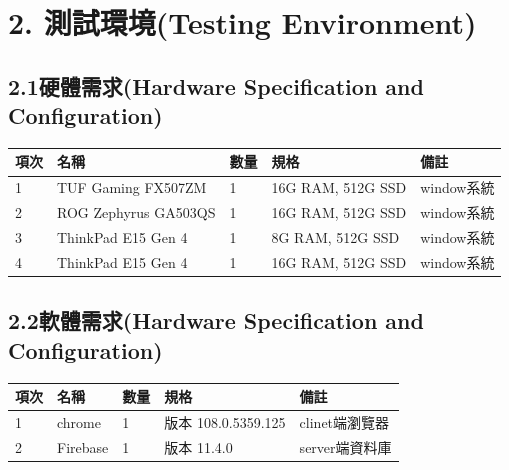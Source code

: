 \documentclass{report}
\begin{document}
\section*{2. 測試環境(Testing Environment)}
\subsection*{2.1硬體需求(Hardware Specification and Configuration)}
\begin{tabularx}{\textwidth}{
  |p{}%
  |p{}%
  |p{}%
  |p{}%
  |p{}|%
}
  \hline
  項次 &  名稱 & 數量 & 規格  & 備註  \\ \hline
  1 & TUF Gaming FX507ZM & 1 & 16G RAM, 512G SSD & window系統  \\ \hline
  2 & ROG Zephyrus GA503QS & 1 & 16G RAM, 512G SSD & window系統  \\ \hline
  3 & ThinkPad E15 Gen 4 & 1 & 8G RAM, 512G SSD & window系統  \\ \hline
  4 & ThinkPad E15 Gen 4 & 1 & 16G RAM, 512G SSD & window系統  \\ \hline
  
\end{tabularx}

\subsection*{2.2軟體需求(Hardware Specification and Configuration)}
\begin{tabularx}{\textwidth}{ 
  |p{}%
  |p{}%
  |p{}%
  |p{}%
  |p{}|%
}
  \hline
  項次 &  名稱 & 數量 & 規格  & 備註  \\
  \hline
  1 & chrome & 1 & 版本 108.0.5359.125 & clinet端瀏覽器  \\
  \hline
  2 & Firebase & 1 & 版本 11.4.0 & server端資料庫  \\
  \hline
\end{tabularx}
\end{document}
